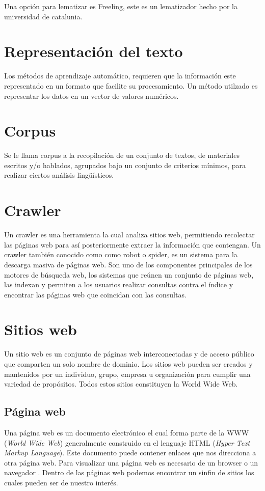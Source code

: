 Una opción para lematizar es Freeling, este es un lematizador hecho por la
universidad de catalunia.

\section[Representación del t.]{Representación del texto}
Los métodos de aprendizaje automático, requieren que la información este
representado en un formato que facilite su procesamiento. Un método utilzado
es representar los datos en un vector de valores numéricos.

\section{Corpus}
Se le llama corpus a la recopilación de un conjunto de textos, de materiales escritos y/o hablados, 
agrupados bajo un conjunto de criterios mínimos, para realizar ciertos análisis lingüísticos.



\section{Crawler}
Un crawler \cite{once} es una herramienta la cual analiza sitios web, permitiendo recolectar 
las páginas web para así posteriormente extraer la información que contengan. Un crawler también 
conocido como como robot o spider, es un sistema para la descarga masiva de páginas web. Son uno de 
los componentes principales de los motores de búsqueda web, los sistemas que reúnen un conjunto de 
páginas web, las indexan y permiten a los usuarios realizar consultas contra el índice y encontrar las 
páginas web que coincidan con las consultas.


\section{Sitios web}
Un sitio web \cite{doce} es un conjunto de páginas web interconectadas y de acceso público que comparten 
un solo nombre de dominio. Los sitios web pueden ser creados y mantenidos por un individuo, grupo, empresa 
u organización para cumplir una variedad de propósitos. Todos estos sitios constituyen la World Wide Web. 

\subsection{Página web}
Una página web es un documento electrónico el cual forma parte de la WWW (\textit{World Wide Web}) generalmente 
construido en el lenguaje HTML (\textit{Hyper Text Markup Language}). Este documento puede contener enlaces que nos 
direcciona a otra página web. Para visualizar una página web es necesario de un browser o un navegador \cite{trece}. 
Dentro de las páginas web podemos encontrar un sinfin de sitios los cuales pueden ser de nuestro interés.

